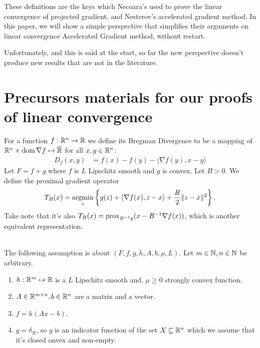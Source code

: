 \documentclass[12pt]{article}
\begin{document}
    These definitions are the keys which Necoara's used to prove the linear convergence of projected gradient, and Nesterov's accelerated gradient method. 
    In this paper, we will show a simple perspective that simplifies their arguments on linear convergence Accelerated Gradient method, without restart. 
    \par
    Unfortunately, and this is said at the start, so far the new perspective doesn't produce new results that are not in the literature. 

\section{Precursors materials for our proofs of linear convergence}
    For a function $f: \mathbb R^n \rightarrow \mathbb R$ we define its Bregman Divergence to be a mapping of $\mathbb R^n \times \operatorname{dom}\nabla f\mapsto \overline {\mathbb R}$ for all $x, y \in \mathbb R^n$: 
    \begin{align*}
        D_f(x, y) &= 
        f(x) - f(y) - \langle \nabla f(y), x - y\rangle 
    \end{align*}
    Let $F = f + g$ where $f$ is $L$ Lipschitz smooth and $g$ is convex.
    Let $B > 0$. 
    We define the proximal gradient operator 
    \begin{align*}
        T_{B}(x) = \mathop{\rm argmin}\limits_{z}\left\lbrace
            g(z) + \langle \nabla f(x), z - x\rangle + \frac{B}{2}\Vert z - x\Vert^2
        \right\rbrace. 
    \end{align*}
    Take note that it's also $T_B(x) = \operatorname{prox}_{B^{-1}g}(x - B^{-1}\nabla f(x))$, which is another equivalent representation. 
    \begin{assumption}\;\label{ass:obj-fxn}\\
        The following assumption is about $(F, f, g, h, A, b, \mu, L)$. 
        Let $m \in \mathbb N, n \in \mathbb N$ be arbitrary. 
        \begin{enumerate}[nosep]
            \item $h: \mathbb R^m \mapsto \mathbb R$ is a $L$ Lipschitz smooth and, $\mu \ge 0$ strongly convex function. 
            \item $A \in \mathbb R^{m \times n}, b \in \mathbb R^n$ are a matrix and a vector. 
            \item $f = h(Ax - b)$. 
            \item $g = \delta_{X}$, so $g$ is an indicator function of the set $X \subseteq \mathbb R^n$ which we assume that it's closed onvex and non-empty. 
        \end{enumerate}
    \end{assumption}
\end{document}
